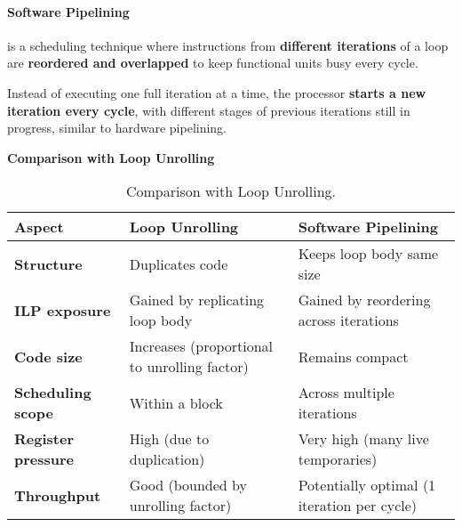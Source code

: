 \paragraph{Software Pipelining}\label{paragraph: Software Pipelining}

 is a scheduling technique where instructions from \textbf{different iterations} of a loop are \textbf{reordered and overlapped} to keep functional units busy every cycle.

\highspace
Instead of executing one full iteration at a time, the processor \textbf{starts a new iteration every cycle}, with different stages of previous iterations still in progress, similar to hardware pipelining.

\highspace
\begin{flushleft}
    \textcolor{Green3}{ \textbf{Comparison with Loop Unrolling}}
\end{flushleft}
\begin{table}[!htp]
    \centering
    \begin{tabular}{@{} l p{11em} p{12em} @{}}
        \toprule
        \textbf{Aspect} & \textbf{Loop Unrolling} & \textbf{Software Pipelining} \\
        \midrule
        \textbf{Structure}          & Duplicates code                               & Keeps loop body same size                     \\ [.5em]
        \textbf{ILP exposure}       & Gained by replicating loop body               & Gained by reordering across iterations        \\ [.5em]
        \textbf{Code size}          & Increases (proportional to unrolling factor)  & Remains compact                               \\ [1.8em]
        \textbf{Scheduling scope}   & Within a block                                & Across multiple iterations                    \\ [.5em]
        \textbf{Register pressure}  & High (due to duplication)                     & Very high (many live temporaries)             \\ [.5em]
        \textbf{Throughput}         & Good (bounded by unrolling factor)            & Potentially optimal (1 iteration per cycle)   \\
        \bottomrule
    \end{tabular}
    \caption{Comparison with Loop Unrolling.}
\end{table}

